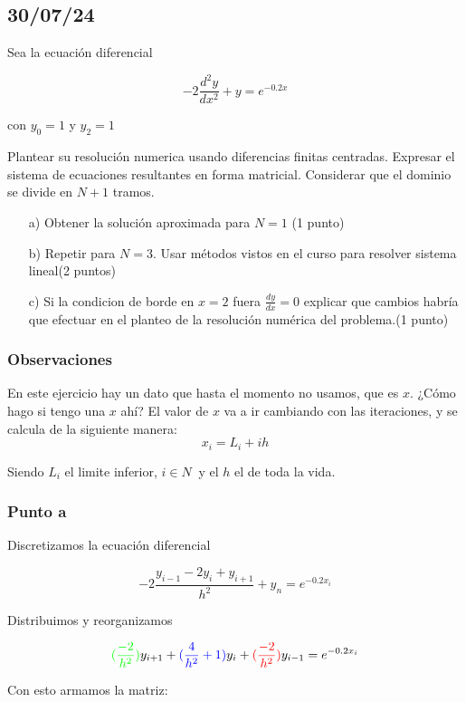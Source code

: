 \subsection{30/07/24}

Sea la ecuación diferencial

$$-2\frac{d^2y}{dx^2} + y = e^{-0.2x}$$

con $y_0 = 1$ y $y_2 = 1$

Plantear su resolución numerica usando diferencias finitas centradas. Expresar el sistema de ecuaciones resultantes en forma matricial. Considerar que el dominio se divide en $N + 1$ tramos.

\begin{enumerate}
    \item[a)] Obtener la solución aproximada para $N = 1$ (1 punto)
    \item[b)] Repetir para $N = 3$. Usar métodos vistos en el curso para resolver sistema lineal(2 puntos)
    \item[c)] Si la condicion de borde en $x = 2$ fuera $\frac{dy}{dx} = 0$ explicar que cambios habría que efectuar en el planteo de la resolución numérica del problema.(1 punto)
\end{enumerate}

\subsubsection{Observaciones}

En este ejercicio hay un dato que hasta el momento no usamos, que es $x$. ¿Cómo hago si tengo una $x$ ahí? El valor de $x$ va a ir cambiando con las iteraciones, y se calcula de la siguiente manera: 
$$x_i = L_i + ih$$

Siendo $L_i$ el limite inferior, $i \in N\ $ y el $h$ el de toda la vida.


\subsubsection{Punto a}

Discretizamos la ecuación diferencial

$$
-2\frac{y_{i-1} - 2y_i + y_{i+1}}{h^2} + y_n = e^{-0.2x_i} 
$$

Distribuimos y reorganizamos

$$
\textcolor{green}{(\frac{-2}{h^2})}y_{i+1} + \textcolor{blue}{(\frac{4}{h^2} + 1)}y_i + \textcolor{red}{(\frac{-2}{h^2})}y_{i-1} = e^{-0.2x_i} 
$$

Con esto armamos la matriz: 



